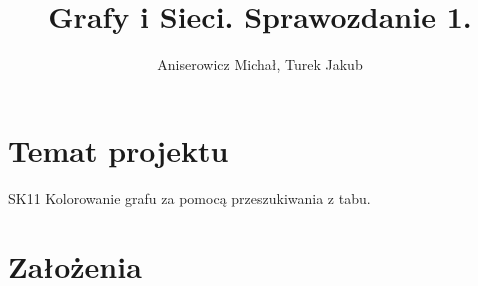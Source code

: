 \documentclass[a4paper,10pt]{article}
\title{Grafy i Sieci. Sprawozdanie 1.}
\author{Aniserowicz Michał, Turek Jakub}
\begin{document}
\maketitle

\section{Temat projektu}

SK11 Kolorowanie grafu za pomocą przeszukiwania z tabu.

\section{Założenia}
\end{document}
